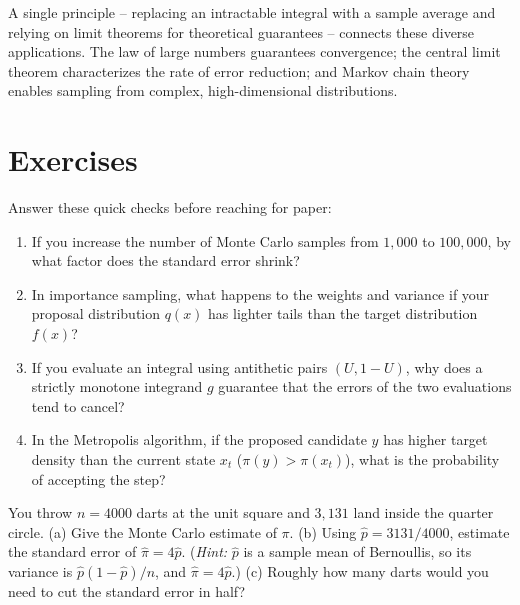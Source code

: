 \begin{aestheticbox}
A single principle -- replacing an intractable integral with a sample average
and relying on limit theorems for theoretical guarantees -- connects these diverse
applications. The law of large numbers guarantees convergence; the central limit
theorem characterizes the rate of error reduction; and Markov chain theory enables
sampling from complex, high-dimensional distributions.
\end{aestheticbox}

\section{Exercises}
\label{ch35:exercises}

\begin{exercise}
\label{ch35:exr-warmup}
Answer these quick checks before reaching for paper:
\begin{enumerate}[label=(\alph*)]
  \item If you increase the number of Monte Carlo samples from $1{,}000$ to $100{,}000$, by what factor does the standard error shrink?
  \item In importance sampling, what happens to the weights and variance if your proposal distribution $q(x)$ has lighter tails than the target distribution $f(x)$?
  \item If you evaluate an integral using antithetic pairs $(U, 1-U)$, why does a strictly monotone integrand $g$ guarantee that the errors of the two evaluations tend to cancel?
  \item In the Metropolis algorithm, if the proposed candidate $y$ has higher target density than the current state $x_t$ ($\pi(y) > \pi(x_t)$), what is the probability of accepting the step?
\end{enumerate}
\end{exercise}

\begin{exercise}
\label{ch35:exr-pi}
You throw $n = 4000$ darts at the unit square and $3{,}131$ land inside the
quarter circle. (a) Give the Monte Carlo estimate of $\pi$. (b) Using
$\hat p = 3131/4000$, estimate the standard error of $\hat\pi = 4\hat p$.
(\emph{Hint:} $\hat p$ is a sample mean of Bernoullis, so its variance is
$\hat p(1-\hat p)/n$, and $\hat\pi = 4\hat p$.) (c) Roughly how many darts would
you need to cut the standard error in half?
\end{exercise}

